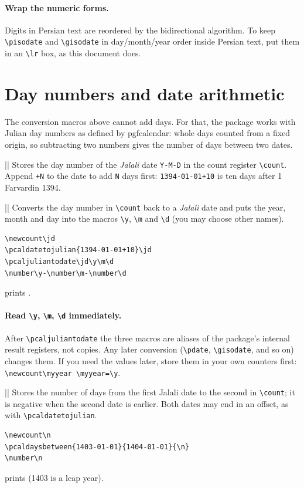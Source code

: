 \documentclass[11pt]{article}
\newcommand\iso[1]{\lr{#1}}            %
\newcommand\pkg[1]{\textsf{#1}}
\newcommand\cs[1]{\texttt{\textbackslash #1}}
\begin{document}
\paragraph{Wrap the numeric forms.} Digits in Persian text are reordered by the bidirectional
algorithm. To keep \cs{pisodate} and \cs{gisodate} in day/month/year order inside Persian text, put
them in an \cs{lr} box, as this document does.

\section{Day numbers and date arithmetic}\label{sec:day5}

The conversion macros above cannot add days. For that, the package works with Julian day numbers as
defined by \pkg{pgfcalendar}: whole days counted from a fixed origin, so subtracting two numbers gives
the number of days between two dates.

\macro||
Stores the day number of the \emph{Jalali} date \texttt{Y-M-D} in the count register \cs{count}. Append
\texttt{+N} to the date to add \texttt{N} days first: \texttt{1394-01-01+10} is ten days after
1 Farvardin 1394.

\macro|\pcaljuliantodate{\count}{\y}{\m}{\d}|
Converts the day number in \cs{count} back to a \emph{Jalali} date and puts the year, month and day
into the macros \cs{y}, \cs{m} and \cs{d} (you may choose other names).

\begin{verbatim}
\newcount\jd
\pcaldatetojulian{1394-01-01+10}\jd
\pcaljuliantodate\jd\y\m\d
\number\y-\number\m-\number\d
\end{verbatim}
\jd%
\pcaljuliantodate\jd\y\m\d%
prints \iso{\number\y-\number\m-\number\d}.

\paragraph{Read \cs{y}, \cs{m}, \cs{d} immediately.} After \cs{pcaljuliantodate} the three macros
are aliases of the package's internal result registers, not copies. Any later conversion
(\cs{pdate}, \cs{gisodate}, and so on) changes them. If you need the values later, store them in your
own counters first: \texttt{\cs{newcount}\cs{myyear}\ \cs{myyear=\cs{y}}}.

\macro||
Stores the number of days from the first Jalali date to the second in \cs{count}; it is negative when the
second date is earlier. Both dates may end in an offset, as with \cs{pcaldatetojulian}.
\begin{verbatim}
\newcount\n
\pcaldaysbetween{1403-01-01}{1404-01-01}{\n}
\number\n
\end{verbatim}
%
prints \number\jd{} (1403 is a leap year).
\end{document}
